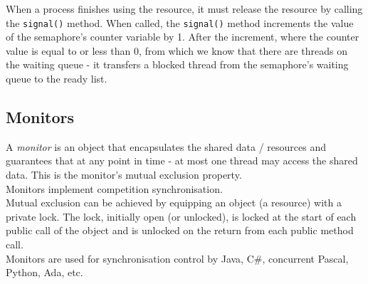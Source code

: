 When a process finishes using the resource, it must release the resource by calling the \verb|signal()| method. When called, the \verb|signal()| method increments the value of the semaphore's counter variable by 1. After the increment, where the counter value is equal to or less than 0, from which we know that there are threads on the waiting queue - it transfers a blocked thread from the semaphore's waiting queue to the ready list. 

\subsection{Monitors}
A \textit{monitor} is an object that encapsulates the shared data / resources and guarantees that at any point in time - at most one thread may access the shared data. This is the monitor's mutual exclusion property.\\

Monitors implement competition synchronisation.\\

Mutual exclusion can be achieved by equipping an object (a resource) with a private lock. The lock, initially open (or unlocked), is locked at the start of each public call of the object and is unlocked on the return from each public method call.\\

Monitors are used for synchronisation control by Java, C\#, concurrent Pascal, Python, Ada, etc. 